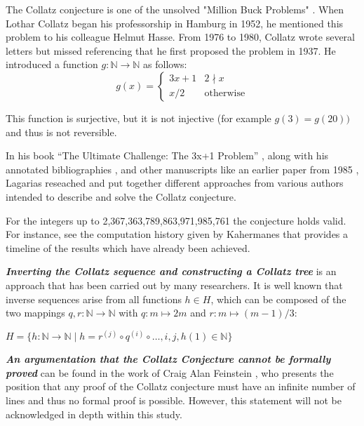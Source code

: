 \par\medskip
The Collatz conjecture is one of the unsolved "Million Buck Problems" \cite{Ref_Williams_2000}. When Lothar Collatz began his professorship in Hamburg in 1952, he mentioned this problem to his colleague Helmut Hasse. From 1976 to 1980, Collatz wrote several letters but missed referencing that he first proposed the problem in 1937. He introduced a function $g:\mathbb{N}\rightarrow\mathbb{N}$ as follows:
\begin{equation}
\label{eq:func_collatz}
g(x)=
\begin{cases}
3x+1	&	2\nmid x\\
x/2		&	\text{otherwise}
\end{cases}
\end{equation}

This function is surjective, but it is not injective (for example $g(3)=g(20))$ and thus is not reversible.

\par\medskip
In his book “The Ultimate Challenge: The 3x+1 Problem” \cite{Ref_Lagarias_2010}, along with his annotated bibliographies \cite{Ref_Lagarias_2011}, \cite{Ref_Lagarias_2012} and other manuscripts like an earlier paper from 1985 \cite{Ref_Lagarias_1985}, Lagarias reseached and put together different approaches from various authors intended to describe and solve the Collatz conjecture.

\par\medskip
For the integers up to 2,367,363,789,863,971,985,761 the conjecture holds valid. For instance, see the computation history given by Kahermanes \cite{Ref_Kahermanes_2011} that provides a timeline of the results which have already been achieved.

\par\medskip
\textit{\textbf{Inverting the Collatz sequence and constructing a Collatz tree}} is an approach that has been carried out by many researchers. It is well known that inverse sequences \cite{Ref_Klisse_2010} arise from all functions $h\in H$, which can be composed of the two mappings $q,r:\mathbb{N}\rightarrow\mathbb{N}$ with $q:m\mapsto2m$ and $r:m\mapsto(m-1)/3$:
\begin{center}
$H=\{h:\mathbb{N}\rightarrow
\mathbb{N}\mid h=r^{(j)}\circ q^{(i)}\circ\ldots,i,j,h(1)\in\mathbb{N}\}$
\end{center}

\textit{\textbf{An argumentation that the Collatz Conjecture cannot be formally proved}} can be found in the work of Craig Alan Feinstein \cite{Ref_Feinstein_2012}, who presents the position that any proof of the Collatz conjecture must have an infinite number of lines and thus no formal proof is possible. However, this statement will not be acknowledged in depth within this study.

